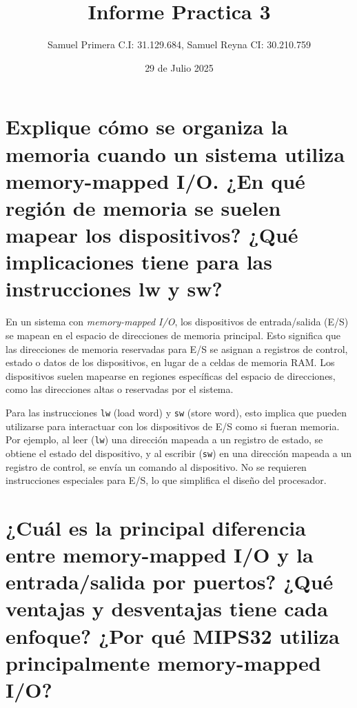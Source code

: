 \documentclass{article}
\title{Informe Practica 3}
\author{Samuel Primera C.I: 31.129.684, Samuel Reyna CI: 30.210.759}
\date{29 de Julio 2025}
\begin{document}
\maketitle

\section{Explique cómo se organiza la memoria cuando un sistema utiliza memory-mapped I/O. ¿En qué región de memoria se suelen mapear los dispositivos? ¿Qué implicaciones tiene para las instrucciones lw y sw?}

En un sistema con \textit{memory-mapped I/O}, los dispositivos de entrada/salida (E/S) se mapean en el espacio de direcciones de memoria principal. Esto significa que las direcciones de memoria reservadas para E/S se asignan a registros de control, estado o datos de los dispositivos, en lugar de a celdas de memoria RAM. Los dispositivos suelen mapearse en regiones específicas del espacio de direcciones, como las direcciones altas o reservadas por el sistema.


Para las instrucciones \texttt{lw} (load word) y \texttt{sw} (store word), esto implica que pueden utilizarse para interactuar con los dispositivos de E/S como si fueran memoria. Por ejemplo, al leer (\texttt{lw}) una dirección mapeada a un registro de estado, se obtiene el estado del dispositivo, y al escribir (\texttt{sw}) en una dirección mapeada a un registro de control, se envía un comando al dispositivo. No se requieren instrucciones especiales para E/S, lo que simplifica el diseño del procesador.

\section{¿Cuál es la principal diferencia entre memory-mapped I/O y la entrada/salida por puertos? ¿Qué ventajas y desventajas tiene cada enfoque? ¿Por qué MIPS32 utiliza principalmente memory-mapped I/O?}
\end{document}
